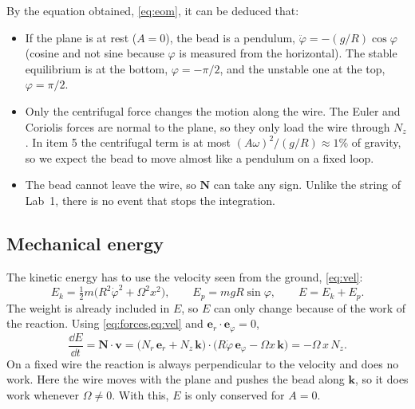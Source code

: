 \documentclass[11pt,a4paper]{article}
\newcommand{\dt}[1]{\dot{#1}}
\newcommand{\ddt}[1]{\ddot{#1}}
\newcommand{\er}{\bm{e}_r}
\newcommand{\ephi}{\bm{e}_\varphi}
\newcommand{\kk}{\bm{k}}
\begin{document}
By the equation obtained, \cref{eq:eom}, it can be deduced that:
\begin{itemize}[noitemsep,topsep=2pt]
\item If the plane is at rest ($A=0$), the bead is a pendulum, $\ddt\varphi=-(g/R)\cos\varphi$ (cosine and not sine because $\varphi$ is measured from the horizontal). The stable equilibrium is at the bottom, $\varphi=-\pi/2$, and the unstable one at the top, $\varphi=\pi/2$.
\item Only the centrifugal force changes the motion along the wire. The Euler and Coriolis forces are normal to the plane, so they only load the wire through $N_z$. In item 5 the centrifugal term is at most $(A\omega)^2/(g/R)\approx1\%$ of gravity, so we expect the bead to move almost like a pendulum on a fixed loop.
\item The bead cannot leave the wire, so $\bm N$ can take any sign. Unlike the string of Lab~1, there is no event that stops the integration.
\end{itemize}

\subsection{Mechanical energy}
The kinetic energy has to use the velocity seen from the ground, \cref{eq:vel}:
\begin{equation}
E_k=\tfrac12m\big(R^2\dt\varphi^2+\Omega^2x^2\big),\qquad E_p=mgR\sin\varphi,\qquad E=E_k+E_p .
\label{eq:E}
\end{equation}
The weight is already included in $E$, so $E$ can only change because of the work of the reaction. Using \cref{eq:forces,eq:vel} and $\er\cdot\ephi=0$,
\begin{equation}
\frac{\dd E}{\dd t}=\bm N\cdot\bm v=\big(N_r\,\er+N_z\,\kk\big)\cdot\big(R\dt\varphi\,\ephi-\Omega x\,\kk\big)=-\Omega\,x\,N_z .
\label{eq:Edot}
\end{equation}
On a fixed wire the reaction is always perpendicular to the velocity and does no work. Here the wire moves with the plane and pushes the bead along $\kk$, so it does work whenever $\Omega\neq0$. With this, $E$ is only conserved for $A=0$.
\end{document}
